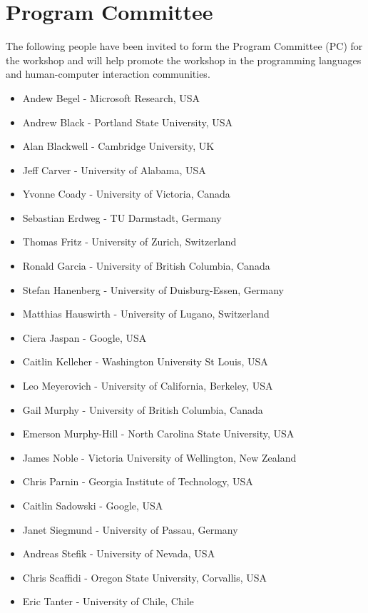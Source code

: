 \documentclass{sigplanconf}
\begin{document}
\section{Program Committee}

The following people have been invited to form the Program Committee (PC) for the workshop and will help promote the workshop in the programming languages and human-computer interaction communities.

\begin{itemize}
\item Andew Begel - Microsoft Research, USA
\item Andrew Black - Portland State University, USA
\item Alan Blackwell - Cambridge University, UK
\item Jeff Carver - University of Alabama, USA
\item Yvonne Coady - University of Victoria, Canada
\item Sebastian Erdweg - TU Darmstadt, Germany
\item Thomas Fritz - University of Zurich, Switzerland
\item Ronald Garcia - University of British Columbia, Canada
\item Stefan Hanenberg - University of Duisburg-Essen, Germany
\item Matthias Hauswirth - University of Lugano, Switzerland
\item Ciera Jaspan - Google, USA
\item Caitlin Kelleher - Washington University St Louis, USA
\item Leo Meyerovich - University of California, Berkeley, USA
\item Gail Murphy - University of British Columbia, Canada
\item Emerson Murphy-Hill - North Carolina State University, USA
\item James Noble - Victoria University of Wellington, New Zealand
\item Chris Parnin - Georgia Institute of Technology, USA
\item Caitlin Sadowski - Google, USA
\item Janet Siegmund - University of Passau, Germany
\item Andreas Stefik - University of Nevada, USA
\item Chris Scaffidi - Oregon State University, Corvallis, USA
\item Eric Tanter - University of Chile, Chile
\end{itemize}
\end{document}

